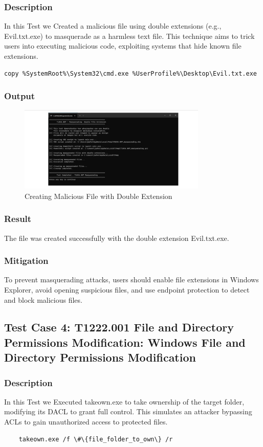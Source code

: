 \documentclass[11pt]{article}
\begin{document}
\subsubsection{Description}
In this Test we Created a malicious file using double extensions (e.g., Evil.txt.exe) to masquerade as a harmless text file. This technique aims to trick users into executing malicious code, exploiting systems that hide known file extensions.
\begin{lstlisting}
copy %SystemRoot%\System32\cmd.exe %UserProfile%\Desktop\Evil.txt.exe
\end{lstlisting}
\subsubsection{Output}
\begin{figure}[H]
    \centering
    \includegraphics[width=0.8\textwidth]{./images/5.jpeg}
    \caption{Creating Malicious File with Double Extension}
\end{figure}
\subsubsection{Result}
The file was created successfully with the double extension Evil.txt.exe.
\subsubsection{Mitigation}
To prevent masquerading attacks, users should enable file extensions in Windows Explorer, avoid opening suspicious files, and use endpoint protection to detect and block malicious files.
\subsection{Test Case 4: T1222.001 File and Directory Permissions Modification: Windows File and Directory Permissions Modification}
\subsubsection{Description}
In this Test we Executed takeown.exe to take ownership of the target folder, modifying its DACL to grant full control. This simulates an attacker bypassing ACLs to gain unauthorized access to protected files.
\begin{lstlisting}
    takeown.exe /f \#\{file_folder_to_own\} /r
\end{lstlisting}
\end{document}
